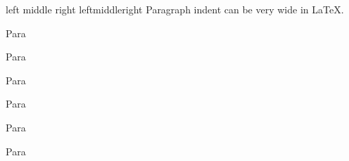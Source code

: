 \documentclass{article}
\newlength\mylen                        %
\begin{document}
        left middle right\newline
        left\dotfill middle\hrulefill right\newline
        {
            \setlength\parindent{24em}
            Paragraph indent can be very wide in \LaTeX . 
        }\par
        {
            Para\par
            \addtolength\parindent{2em}Para\par
            \addtolength\parindent{2em}Para
        }\par
        {
            Para\par
            \addtolength\parindent{\mylen}Para\par
            \addtolength\parindent{\mylen}Para
        }
\end{document}
